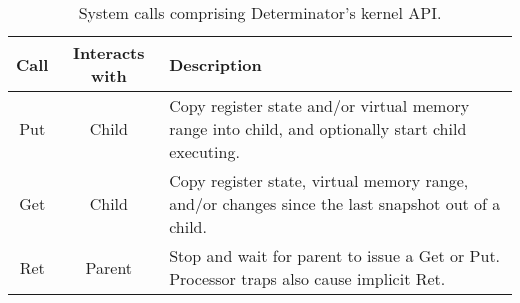 
\begin{table*}[t]
\centering
\begin{tabular}{c | c | l}
Call & Interacts with & Description \\
\hline
Put & Child & Copy register state and/or virtual memory range into child, and optionally start child executing. \\
Get & Child & Copy register state, virtual memory range, and/or changes since the last snapshot out of a child. \\
Ret & Parent & Stop and wait for parent to issue a Get or Put. Processor traps also cause implicit Ret. \\
\end{tabular}
\caption{System calls comprising Determinator’s kernel API.}
\label{tab:syscalls}
\end{table*}

\endinput

